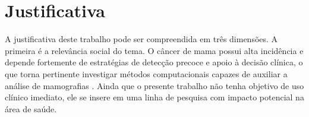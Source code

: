 \documentclass[
    12pt,
    openright,
    oneside,
    a4paper,
    english,
    brazil
]{abntex2}
\begin{document}
%
%
%
%

\section{Justificativa}

A justificativa deste trabalho pode ser compreendida em três dimensões. A primeira é a relevância social do tema. O câncer de mama possui alta incidência e depende fortemente de estratégias de detecção precoce e apoio à decisão clínica, o que torna pertinente investigar métodos computacionais capazes de auxiliar a análise de mamografias \cite{WHO2026BreastCancer}. Ainda que o presente trabalho não tenha objetivo de uso clínico imediato, ele se insere em uma linha de pesquisa com impacto potencial na área de saúde.
\end{document}
